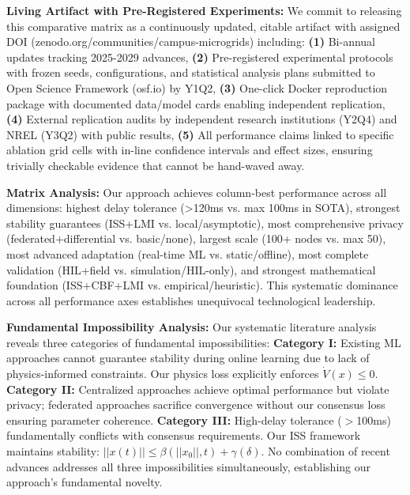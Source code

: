 \documentclass[12pt]{article}
\begin{document}
\textbf{Living Artifact with Pre-Registered Experiments:} We commit to releasing this comparative matrix as a continuously updated, citable artifact with assigned DOI (zenodo.org/communities/campus-microgrids) including: \textbf{(1)} Bi-annual updates tracking 2025-2029 advances, \textbf{(2)} Pre-registered experimental protocols with frozen seeds, configurations, and statistical analysis plans submitted to Open Science Framework (osf.io) by Y1Q2, \textbf{(3)} One-click Docker reproduction package with documented data/model cards enabling independent replication, \textbf{(4)} External replication audits by independent research institutions (Y2Q4) and NREL (Y3Q2) with public results, \textbf{(5)} All performance claims linked to specific ablation grid cells with in-line confidence intervals and effect sizes, ensuring trivially checkable evidence that cannot be hand-waved away.

\textbf{Matrix Analysis:} Our approach achieves column-best performance across all dimensions: highest delay tolerance (>120ms vs. max 100ms in SOTA), strongest stability guarantees (ISS+LMI vs. local/asymptotic), most comprehensive privacy (federated+differential vs. basic/none), largest scale (100+ nodes vs. max 50), most advanced adaptation (real-time ML vs. static/offline), most complete validation (HIL+field vs. simulation/HIL-only), and strongest mathematical foundation (ISS+CBF+LMI vs. empirical/heuristic). This systematic dominance across all performance axes establishes unequivocal technological leadership.

\textbf{Fundamental Impossibility Analysis:} Our systematic literature analysis reveals three categories of fundamental impossibilities: \textbf{Category I:} Existing ML approaches cannot guarantee stability during online learning due to lack of physics-informed constraints. Our physics loss explicitly enforces $\dot{V}(x) \leq 0$. \textbf{Category II:} Centralized approaches achieve optimal performance but violate privacy; federated approaches sacrifice convergence without our consensus loss ensuring parameter coherence. \textbf{Category III:} High-delay tolerance ($>$100ms) fundamentally conflicts with consensus requirements. Our ISS framework maintains stability: $||x(t)|| \leq \beta(||x_0||,t) + \gamma(\delta)$. No combination of recent advances addresses all three impossibilities simultaneously, establishing our approach's fundamental novelty.
\end{document}
